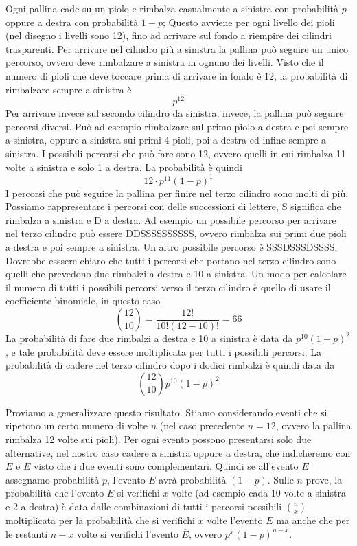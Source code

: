 Ogni pallina cade su un piolo e rimbalza casualmente a sinistra con 
probabilità $p$ oppure a destra con probabilità $1-p$; Questo avviene per 
ogni livello dei pioli (nel disegno i livelli sono 12), fino ad arrivare sul 
fondo a riempire dei cilindri trasparenti.
Per arrivare nel cilindro più a sinistra la pallina può seguire un unico 
percorso, ovvero deve rimbalzare a sinistra in ognuno dei livelli. 
Visto che il numero di pioli che deve toccare prima di arrivare in fondo è 
12, la probabilità di rimbalzare sempre a sinistra è $$p^{12}$$
Per arrivare invece sul secondo cilindro da sinistra, invece, la pallina può 
seguire percorsi diversi. Può ad esempio rimbalzare sul primo piolo a destra 
e poi sempre a sinistra, oppure a sinistra sui primi 4 pioli, poi a destra ed 
infine sempre a sinistra. I possibili percorsi che può fare sono 12, ovvero 
quelli in cui rimbalza 11 volte a sinistra e solo 1 a destra. La probabilità 
è quindi
$$12 \cdot p^{11}(1-p)^1$$
I percorsi che può seguire la pallina per finire nel terzo cilindro sono 
molti di più. Possiamo rappresentare i percorsi con delle successioni di 
lettere, S significa che rimbalza a sinistra e D a destra. Ad esempio un 
possibile percorso per arrivare nel terzo cilindro può essere
DDSSSSSSSSSS, ovvero rimbalza sui primi due pioli a destra e poi sempre a 
sinistra. Un altro possibile percorso è SSSDSSSDSSSS. Dovrebbe esssere chiaro 
che tutti i percorsi che portano nel terzo cilindro sono quelli che prevedono 
due rimbalzi a destra e 10 a sinistra. Un modo per calcolare il numero di 
tutti i possibili percorsi verso il terzo cilindro è quello di usare il 
coefficiente binomiale, in questo caso
$$ \binom{12}{10}=\dfrac{12!}{10!(12-10)!}=66$$
La probabilità di fare due rimbalzi a destra e 10 a sinistra è data da
$p^{10}(1-p)^2$, e tale probabilità deve essere moltiplicata per tutti i 
possibili percorsi. La probabilità di cadere nel terzo cilindro dopo i dodici 
rimbalzi è quindi data da
$$ \binom{12}{10} p^{10}(1-p)^2$$

Proviamo a generalizzare questo risultato. Stiamo considerando eventi che si 
ripetono un certo numero di volte $n$ (nel caso precedente $n=12$, ovvero la 
pallina rimbalza 12 volte sui pioli). Per ogni evento possono presentarsi 
solo due alternative, nel nostro caso cadere a sinistra oppure a destra, che 
indicheremo con $E$ e $\overline E$ visto che i due eventi sono complementari.
Quindi se all'evento $E$ assegnamo probabilità $p$, l'evento $\overline E$ 
avrà probabilità $(1-p)$.
Sulle $n$ prove, la probabilità che l'evento $E$ si verifichi $x$ volte (ad 
esempio cada 10 volte a sinistra e 2 a destra) è data dalle combinazioni di 
tutti i percorsi possibili $\binom{n}{x}$ moltiplicata per la probabilità che 
si verifichi $x$ volte l'evento $E$ ma anche che per le restanti $n-x$ volte 
si verifichi l'evento $\overline E$, ovvero $p^x(1-p)^{n-x}$.

